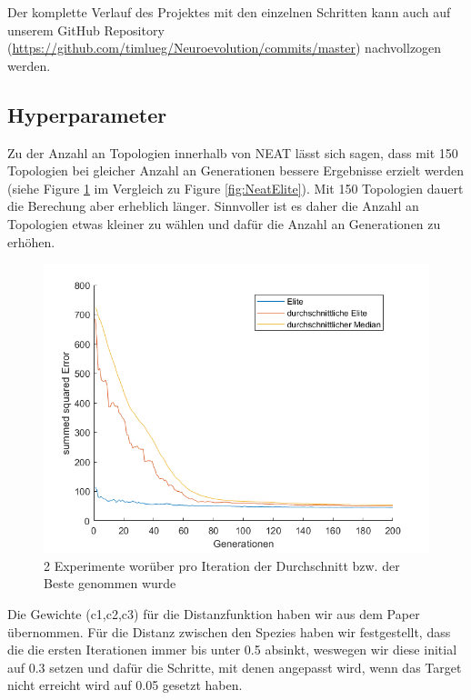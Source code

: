 \documentclass{hbrs-ecta-report}
\begin{document}
Der komplette Verlauf des Projektes mit den einzelnen Schritten kann auch auf unserem GitHub Repository (\url{https://github.com/timlueg/Neuroevolution/commits/master}) nachvollzogen werden. \\ 

\subsection{Hyperparameter}\label{sec:parameter}
Zu der Anzahl an Topologien innerhalb von NEAT lässt sich sagen, dass mit 150 Topologien bei gleicher Anzahl an Generationen bessere Ergebnisse erzielt werden (siehe Figure \ref{fig:150Topos} im Vergleich zu Figure \ref{fig:NeatElite}). Mit 150 Topologien dauert die Berechung aber erheblich länger. Sinnvoller ist es daher
 die Anzahl an Topologien etwas kleiner zu wählen und dafür die Anzahl an Generationen zu erhöhen.\\
\begin{figure}[h!]
	\includegraphics[width=\linewidth]{img/150Topos}
	\caption{2 Experimente worüber pro Iteration der Durchschnitt bzw. der Beste genommen wurde}
	\label{fig:150Topos}
\end{figure}

Die Gewichte (c1,c2,c3) für die Distanzfunktion haben wir aus dem Paper übernommen. Für die Distanz zwischen den Spezies haben wir festgestellt, dass die die ersten Iterationen immer bis unter 0.5 absinkt, weswegen wir diese initial auf 0.3 setzen und dafür die Schritte, mit denen angepasst wird, wenn das Target nicht erreicht wird auf 0.05 gesetzt haben.\\
\end{document}
